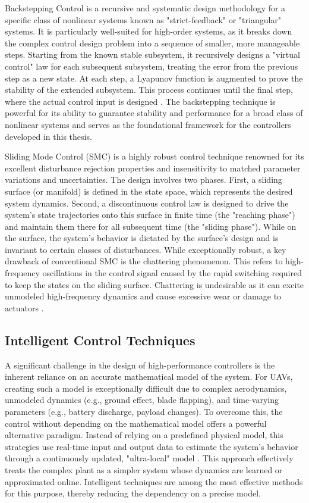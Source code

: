 Backstepping Control is a recursive and systematic design methodology for a specific class of nonlinear systems known as "strict-feedback" or "triangular" systems. It is particularly well-suited for high-order systems, as it breaks down the complex control design problem into a sequence of smaller, more manageable steps. Starting from the known stable subsystem, it recursively designs a "virtual control" law for each subsequent subsystem, treating the error from the previous step as a new state. At each step, a Lyapunov function is augmented to prove the stability of the extended subsystem. This process continues until the final step, where the actual control input is designed \cite{bsc1,bsc2,bsc3,glida2020dobsc,glida2019fabsc,guettal2022fobsc}. The backstepping technique is powerful for its ability to guarantee stability and performance for a broad class of nonlinear systems and serves as the foundational framework for the controllers developed in this thesis.

Sliding Mode Control (SMC) is a highly robust control technique renowned for its excellent disturbance rejection properties and insensitivity to matched parameter variations and uncertainties. The design involves two phases. First, a sliding surface (or manifold) is defined in the state space, which represents the desired system dynamics. Second, a discontinuous control law is designed to drive the system's state trajectories onto this surface in finite time (the "reaching phase") and maintain them there for all subsequent time (the "sliding phase"). While on the surface, the system's behavior is dictated by the surface's design and is invariant to certain classes of disturbances. While exceptionally robust, a key drawback of conventional SMC is the chattering phenomenon. This refers to high-frequency oscillations in the control signal caused by the rapid switching required to keep the states on the sliding surface. Chattering is undesirable as it can excite unmodeled high-frequency dynamics and cause excessive wear or damage to actuators  \cite{smc1,smc2,smc3,Backstepping_Ref,guettal2020chebsmc}.

\subsection{Intelligent Control Techniques}
A significant challenge in the design of high-performance controllers is the inherent reliance on an accurate mathematical model of the system. For UAVs, creating such a model is exceptionally difficult due to complex aerodynamics, unmodeled dynamics (e.g., ground effect, blade flapping), and time-varying parameters (e.g., battery discharge, payload changes). To overcome this, the control without depending on the mathematical model offers a powerful alternative paradigm. Instead of relying on a predefined physical model, this strategies use real-time input and output data to estimate the system's behavior through a continuously updated, "ultra-local" model  \cite{MFC1,MFC2,MFC3,PID_LQR_Ref,glida2021mffl,glida2020pso}. This approach effectively treats the complex plant as a simpler system whose dynamics are learned or approximated online. Intelligent techniques are among the most effective methods for this purpose, thereby reducing the dependency on a precise model.

